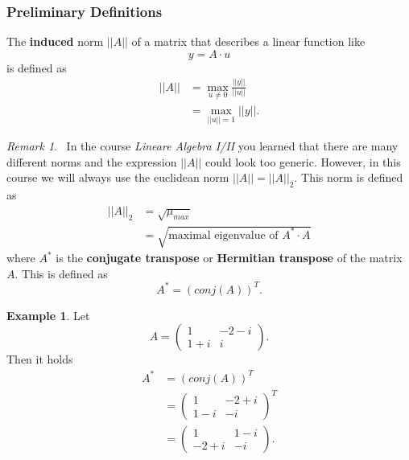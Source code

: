 \documentclass[a4paper,12 pt]{article}
\numberwithin{equation}{section}
\theoremstyle{definition}
\newtheorem{bsp}{Example}
\theoremstyle{remark}
\newtheorem*{bmk}{Remark}
\theoremstyle{definition}
\theoremstyle{definition}
\theoremstyle{definition}
\theoremstyle{remark}
\begin{document}
\subsubsection{Preliminary Definitions}
The \textbf{induced} norm $||A||$ of a matrix that describes a linear function like
\begin{equation}
y=A\cdot u
\label{eq:lin}
\end{equation}
is defined as
\begin{equation}
\begin{split}
||A||&=\max_{u\neq 0}\frac{||y||}{||u||}\\
&=\max_{||u||=1}||y||.
\end{split}
\label{eq:gen}
\end{equation}
\begin{bmk}
\
In the course \textit{Lineare Algebra I/II} you learned that there are many different norms and the expression $||A||$ could look too generic. However, in this course we will always use the euclidean norm $||A||=||A||_2$.
This norm is defined as
\begin{equation}
\begin{split}
||A||_2&=\sqrt{\mu_{max}}\\
&=\sqrt{\text{maximal eigenvalue of }A^*\cdot A}
\end{split}
\end{equation}
where $A^*$ is the \textbf{conjugate transpose} or \textbf{Hermitian transpose} of the matrix $A$. This is defined as
\begin{equation}
A^*=(conj(A))^T.
\end{equation}
\end{bmk}
\begin{bsp}
Let 
\begin{equation*}
A=\begin{pmatrix}
1&-2-i\\
1+i&i
\end{pmatrix}.
\end{equation*}
Then it holds
\begin{equation*}
\begin{split}
A^*&=(conj(A))^T\\
&=
\begin{pmatrix}
1&-2+i\\
1-i&-i
\end{pmatrix}^T\\
&=\begin{pmatrix}
1&1-i\\
-2+i&-i
\end{pmatrix}.
\end{split}
\end{equation*}
\end{bsp}
\end{document}
